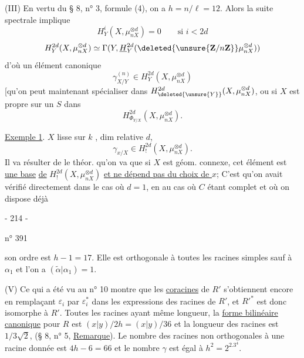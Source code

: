 (III) En vertu du § 8, n° 3, formule (4), on a $h=n/\ell=12$.
Alors la suite spectrale implique
\[
H^i_Y(X,\mu_{nX}^{\otimes d})=0\qquad\text{si }i<2d
\]
\[
H^{2d}_Y(X,\mu_{nX}^{\otimes d})\simeq\Gamma(Y,\underline H^{2d}_Y(\deleted{\unsure{\mathbf Z/n\mathbf Z}}\mu_{nX}^{\otimes d}))
\]
d'où un  élément canonique
\[
\gamma_{X/Y}^{(n)}\in H^{2d}_Y(X,\mu_{nX}^{\otimes d})
\]
[qu'on peut maintenant spécialiser dans $H^{2d}_{\deleted{\unsure{Y}}}(X,\mu_{nX}^{\otimes d})$, ou si $X$ est propre sur un $S$ dans
\[
H^{2d}_{\Phi_{Y/X}}(X,\mu_{nX}^{\otimes d}).
\]


\uline{Exemple 1}. $X$ lisse sur $k$ ,  dim relative $d$,  
\[
\gamma_{x/X}\in H^{2d}_!(X,\mu_{nX}^{\otimes d}).
\]
Il va résulter de le théor. qu'on va  que  si $X$ est géom. connexe, cet élément est \uline{une base} \uline{de} $H^{2d}_!(X,\mu_{nX}^{\otimes d})$ \uline{et ne dépend pas du choix de $x$};  C'est qu'on avait vérifié directement dans le cas où $d=1$, en   au cas où $C$ étant complet et où on dispose déjà
\begin{center}- 214 -\end{center}
\hfill n° 391

son ordre est $h-1=17$. Elle est orthogonale à toutes les racines simples sauf à $\alpha_1$ et l'on a $(\widetilde\alpha|\alpha_1)=1$.

(V) Ce qui a été vu au n° 10 montre que les \uline{coracines} de $R'$ s'obtiennent encore en remplaçant $\varepsilon_i$ par $\varepsilon_i^*$ dans les expressions des racines de $R'$, et $R'^*$ est donc isomorphe à $R'$. Toutes les racines ayant même longueur, la \uline{forme bilinéaire canonique} pour $R$ est $(x|y)/2h=(x|y)/36$ et la longueur des racines est $1/3\sqrt2$, (§ 8, n° 5, \uline{Remarque}). Le nombre des racines non orthogonales à une racine donnée est $4h-6=66$ et le nombre $\gamma$ est égal à $h^2=2^2.3^4$.

